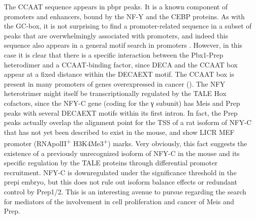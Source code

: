 The CCAAT sequence appears in \ac{pbpr} peaks. It is a known component of promoters and enhancers, bound by the NF-Y and the CEBP proteins. As with the GC-box, it is not surprising to find a promoter-related sequence in a subset of peaks that are overwhelmingly associated with promoters, and indeed this sequence also appears in a general motif search in promoters \parencite{Hartmann2013}. However, in this case it is clear that there is a specific interaction between the Pbx1-Prep heterodimer and a CCAAT-binding factor, since \ac{DECA} and the CCAAT box appear at a fixed distance within the \ac{DECAEXT} motif. The CCAAT box is present in many promoters of genes overexpressed in cancer (\cite{Dolfini2013}). The NFY heterotrimer might itself be transcriptionally regulated by the \ac{TALE} Hox cofactors, since the NFY-C gene (coding for the γ subunit) has Meis and Prep peaks with several \ac{DECAEXT} motifs within its first intron. In fact, the Prep peaks actually overlap the alignment point for the \ac{TSS} of a rat isoform of NFY-C that has not yet been described to exist in the mouse, and show LICR \ac{MEF} promoter (RNApolII\textsuperscript{+} H3K4Me3\textsuperscript{+}) marks. Very obviously, this fact suggests the existence of a previously unrecognized isoform of NFY-C in the mouse and its specific regulation by the \ac{TALE} proteins through differential promoter recruitment. NFY-C is downregulated under the significance threshold in the \ac{prepi} embryo, but this does not rule out isoform balance effects or redundant control by Prep1/2. This is an interesting avenue to pursue regarding the search for mediators of the involvement in cell proliferation and cancer of Meis and Prep.


 

